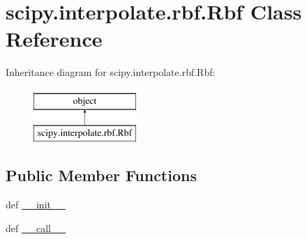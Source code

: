\hypertarget{classscipy_1_1interpolate_1_1rbf_1_1Rbf}{}\section{scipy.\+interpolate.\+rbf.\+Rbf Class Reference}
\label{classscipy_1_1interpolate_1_1rbf_1_1Rbf}
Inheritance diagram for scipy.\+interpolate.\+rbf.\+Rbf\+:\begin{figure}[H]
\begin{center}
\leavevmode
\includegraphics[height=2.000000cm]{classscipy_1_1interpolate_1_1rbf_1_1Rbf}
\end{center}
\end{figure}
\subsection*{Public Member Functions}
\begin{DoxyCompactItemize}
\item 
def \hyperlink{classscipy_1_1interpolate_1_1rbf_1_1Rbf_a8430d662a0bae6c6e62a865eb3ffc76d}{\+\_\+\+\_\+init\+\_\+\+\_\+}
\item 
def \hyperlink{classscipy_1_1interpolate_1_1rbf_1_1Rbf_ac9a1a6c8ad4ae7ba26edb92f26eb2395}{\+\_\+\+\_\+call\+\_\+\+\_\+}
\end{DoxyCompactItemize}
